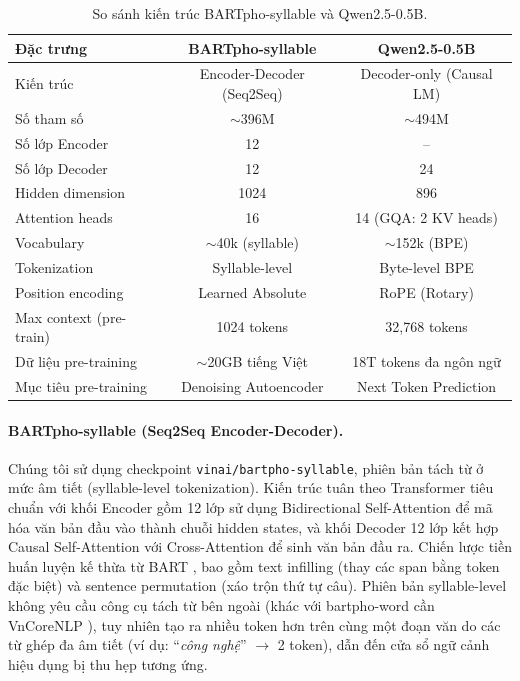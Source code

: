 \documentclass{article}
\begin{document}
\begin{table}[H]
\centering
\caption{So sánh kiến trúc BARTpho-syllable và Qwen2.5-0.5B.}
\label{tab:model_arch}
\begin{tabular}{@{}lcc@{}}
\toprule
\textbf{Đặc trưng} & \textbf{BARTpho-syllable} & \textbf{Qwen2.5-0.5B} \\
\midrule
Kiến trúc            & Encoder-Decoder (Seq2Seq) & Decoder-only (Causal LM) \\
Số tham số            & $\sim$396M                & $\sim$494M \\
Số lớp Encoder        & 12                        & -- \\
Số lớp Decoder        & 12                        & 24 \\
Hidden dimension      & 1024                      & 896 \\
Attention heads       & 16                        & 14 (GQA: 2 KV heads) \\
Vocabulary            & $\sim$40k (syllable)      & $\sim$152k (BPE) \\
Tokenization          & Syllable-level            & Byte-level BPE \\
Position encoding     & Learned Absolute          & RoPE (Rotary) \\
Max context (pre-train)& 1024 tokens              & 32,768 tokens \\
Dữ liệu pre-training  & $\sim$20GB tiếng Việt     & 18T tokens đa ngôn ngữ \\
Mục tiêu pre-training  & Denoising Autoencoder     & Next Token Prediction \\
\bottomrule
\end{tabular}
\end{table}

\paragraph{BARTpho-syllable (Seq2Seq Encoder-Decoder).}
Chúng tôi sử dụng checkpoint \texttt{vinai/bartpho-syllable}, phiên bản tách từ ở mức âm tiết (syllable-level tokenization). Kiến trúc tuân theo Transformer tiêu chuẩn \cite{vaswani2017} với khối Encoder gồm 12 lớp sử dụng Bidirectional Self-Attention để mã hóa văn bản đầu vào thành chuỗi hidden states, và khối Decoder 12 lớp kết hợp Causal Self-Attention với Cross-Attention để sinh văn bản đầu ra. Chiến lược tiền huấn luyện kế thừa từ BART \cite{bart_original}, bao gồm text infilling (thay các span bằng token đặc biệt) và sentence permutation (xáo trộn thứ tự câu). Phiên bản syllable-level không yêu cầu công cụ tách từ bên ngoài (khác với bartpho-word cần VnCoreNLP \cite{vncorenlp}), tuy nhiên tạo ra nhiều token hơn trên cùng một đoạn văn do các từ ghép đa âm tiết (ví dụ: ``\textit{công nghệ}'' $\rightarrow$ 2 token), dẫn đến cửa sổ ngữ cảnh hiệu dụng bị thu hẹp tương ứng.
\end{document}
